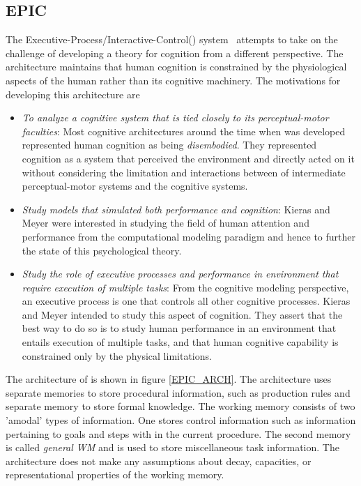 

\subsection{EPIC}
The Executive-Process/Interactive-Control(\epic)
system~\cite{kieras1997overview} attempts to take on the challenge of
developing a theory for cognition from a different perspective. The
\epic architecture maintains that human cognition is constrained by the
physiological aspects of the human rather than its cognitive
machinery. The motivations for developing this architecture are

\begin{itemize}
\item \emph{To analyze a cognitive system that is tied closely to its
    perceptual-motor faculties}: Most cognitive architectures around
  the time when \epic was developed represented human cognition as
  being \emph{disembodied}. They represented cognition as a system that
  perceived the environment and directly acted on it without
  considering the limitation and interactions between of intermediate
  perceptual-motor systems and the cognitive systems.
\item \emph{Study models that simulated both performance and
    cognition}: Kieras and Meyer were interested in studying the field of
  human attention and performance from the computational modeling
  paradigm and hence to further the state of this psychological theory.
\item \emph{Study the role of executive processes and performance in
    environment that require execution of multiple tasks}: From the
  cognitive modeling perspective, an executive process is one that
  controls all other cognitive processes. Kieras and Meyer intended to
  study this aspect of cognition. They assert that the best way to do
  so is to study human performance in an environment that entails
  execution of multiple tasks, and that human cognitive capability is
  constrained only by the physical limitations.
\end{itemize}

The architecture of \epic is shown in figure \ref{EPIC_ARCH}.
%
The \epic architecture uses separate memories to store procedural
information, such as production rules and separate memory to store
formal knowledge. The working memory consists of two 'amodal' types of
information.  One stores control information such as information
pertaining to goals and steps with in the current procedure. The
second memory is called {\em general WM} and is used to store
miscellaneous task information. The \epic architecture does not make
any assumptions about decay, capacities, or representational
properties of the working memory\cite{citeulike:3439185}.


